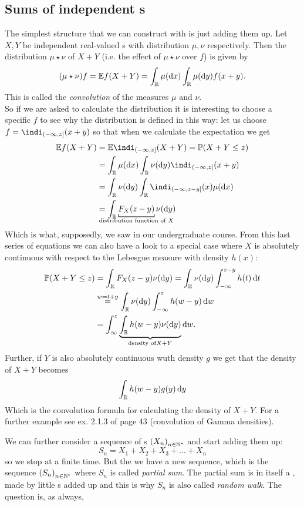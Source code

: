 \documentclass{report}
\begin{document}
\subsection{Sums of independent \rv s}
The simplest structure that we can construct with \rv is just adding them up. Let $X,Y$ be independent real-valued \rv s with distribution $\mu,\nu$ respectively. Then the distribution $\mu\star\nu$ of $X+Y$ (i.e. the effect of $\mu\star\nu$ over $f$) is given by
\[(\mu\star\nu)f=\mathbb{E} f(X+Y)=\int_{\mathbb{R}}\mu(\mathop{}\!\mathrm{d} x)\int_{\mathbb{R}}\mu(\mathop{}\!\mathrm{d} y)f(x+y).\]
This is called the \emph{convolution} of the measures $\mu$ and $\nu$.\\
 So if we are asked to calculate the distribution it is interesting to choose a specific $f$ to see why the distribution is defined in this way: let us choose $f=\indi_{(-\infty,z]}(x+y)$ so that when we calculate the expectation we get
\begin{align*}
	\ev f(X+Y)&=\ev \indi_{(-\infty,z]}(X+Y)=\pr(X+Y\leq z)\\
	&=\int_{\R}\mu(\dx)\int_{\R}\nu(\dy)\indi_{(-\infty,z]}(x+y)\\
	&=\int_{\R}\nu(\dy)\int_{\R}\indi_{(-\infty,z-y]}(x)\mu(\dx)\\
	&=\int_{\R}\underbracket[0.6pt]{F_X(z-y)}_{\mathclap{\text{distribution function of }X}}\nu(\dy)
\end{align*}
Which is what, supposedly, we saw in our undergraduate course.
From this last series of equations we can also have a look to a special case where $X$ is absolutely continuous with respect to the Lebesgue measure with density $h(x)$:
\begin{align*}
	\mathbb{P}(X+Y\leq z)&=\int_{\mathbb{R}}F_X(z-y)\nu(\mathop{}\!\mathrm{d} y)=\int_{\mathbb{R}}\nu(\mathop{}\!\mathrm{d} y)\int_{-\infty}^{z-y}h(t)\mathop{}\!\mathrm{d} t\\
	&\stackrel{w=t+y}{=}\int_{\mathbb{R}}\nu(\mathop{}\!\mathrm{d} y)\int_{-\infty}^{z}h(w-y)\mathop{}\!\mathrm{d} w\\
	&=\int_{\infty}^{z}\underbrace{\int_{\mathbb{R}}h(w-y)\nu(\mathop{}\!\mathrm{d} y)}_{\text{density of} X+Y}\mathop{}\!\mathrm{d} w.
\end{align*}
Further, if $Y$ is also absolutely continuous wuth density $g$ we get that the density of $X+Y$ becomes
\[\int_{\mathbb{R}}h(w-y)g(y)\mathop{}\!\mathrm{d} y\]
Which is the convolution formula for calculating the density of $X+Y$. 
For a further example see ex. 2.1.3 of \cinlar page 43 (convolution of Gamma densities).\par
We can further consider a sequence of \rv s ${(X_n)}_{n\in\mathbb{N}^{*}}$ and start adding them up:
\[S_n=X_1+X_2+X_3+\ldots+X_n\]
so we stop at a finite time. But the we have a new sequence, which is the sequence ${(S_n)}_{n\in\mathbb{N}^*}$ where $S_n$ is called \textit{partial sum}. The partial sum is in itself a \rv{}, made by little \rv s added up and this is why $S_n$ is also called \emph{random walk}. The question is, as always,
\end{document}
